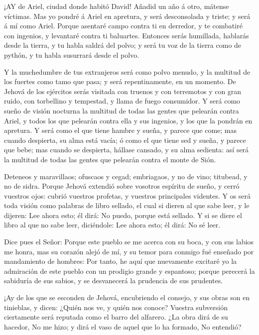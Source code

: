  ¡AY de Ariel, ciudad donde habitó David! Añadid un año á
otro, mátense víctimas.  Mas yo pondré á Ariel en apretura,
y será desconsolada y triste; y será á mí como Ariel. 
Porque asentaré campo contra ti en derredor, y te combatiré con
ingenios, y levantaré contra ti baluartes.  Entonces serás
humillada, hablarás desde la tierra, y tu habla saldrá del polvo; y será
tu voz de la tierra como de pythón, y tu habla susurrará desde el polvo.

 Y la muchedumbre de tus extranjeros será como polvo menudo,
y la multitud de los fuertes como tamo que pasa; y será repentinamente,
en un momento.  De Jehová de los ejércitos serás visitada
con truenos y con terremotos y con gran ruido, con torbellino y
tempestad, y llama de fuego consumidor.  Y será como sueño
de visión nocturna la multitud de todas las gentes que pelearán contra
Ariel, y todos los que pelearán contra ella y sus ingenios, y los que la
pondrán en apretura.  Y será como el que tiene hambre y
sueña, y parece que come; mas cuando despierta, su alma está vacía; ó
como el que tiene sed y sueña, y parece que bebe; mas cuando se
despierta, hállase cansado, y su alma sedienta: así será la multitud de
todas las gentes que pelearán contra el monte de Sión.

 Deteneos y maravillaos; ofuscaos y cegad; embriagaos, y no
de vino; titubead, y no de sidra.  Porque Jehová extendió
sobre vosotros espíritu de sueño, y cerró vuestros ojos: cubrió vuestros
profetas, y vuestros principales videntes.  Y os será toda
visión como palabras de libro sellado, el cual si dieren al que sabe
leer, y le dijeren: Lee ahora esto; él dirá: No puedo, porque está
sellado.  Y si se diere el libro al que no sabe leer,
diciéndole: Lee ahora esto; él dirá: No sé leer.

 Dice pues el Señor: Porque este pueblo se me acerca con su
boca, y con sus labios me honra, mas su corazón alejó de mí, y su temor
para conmigo fué enseñado por mandamiento de hombres:  Por
tanto, he aquí que nuevamente excitaré yo la admiración de este pueblo
con un prodigio grande y espantoso; porque perecerá la sabiduría de sus
sabios, y se desvanecerá la prudencia de sus prudentes.

 ¡Ay de los que se esconden de Jehová, encubriendo el
consejo, y sus obras son en tinieblas, y dicen: ¿Quién nos ve, y quién
nos conoce?  Vuestra subversión ciertamente será reputada
como el barro del alfarero. ¿La obra dirá de su hacedor, No me hizo; y
dirá el vaso de aquel que lo ha formado, No entendió?


